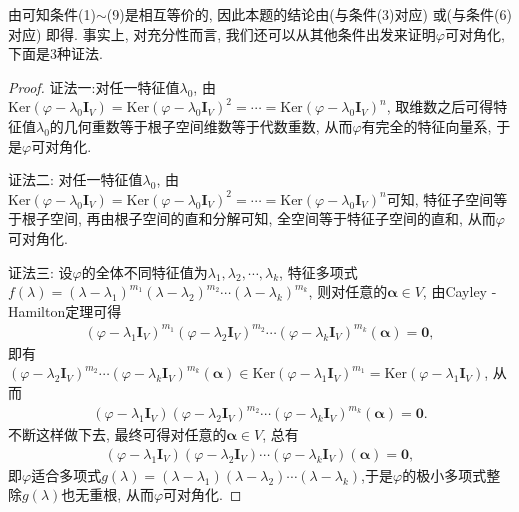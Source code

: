 \documentclass[../../main.tex]{subfiles}%
\begin{document}
\begin{note}
由可知条件(1)$\sim$(9)是相互等价的, 因此本题的结论由(与条件(3)对应) 或(与条件(6)对应) 即得. 事实上, 对充分性而言, 我们还可以从其他条件出发来证明\(\varphi\)可对角化, 下面是\(3\)种证法.
\end{note}
\begin{proof}

{\color{blue}证法一:}对任一特征值\(\lambda_{0}\), 由\(\mathrm{Ker}(\varphi-\lambda_{0}\boldsymbol{I}_{V})=\mathrm{Ker}(\varphi-\lambda_{0}\boldsymbol{I}_{V})^{2}=\cdots=\mathrm{Ker}(\varphi-\lambda_{0}\boldsymbol{I}_{V})^{n}\), 取维数之后可得特征值\(\lambda_{0}\)的几何重数等于根子空间维数等于代数重数, 从而\(\varphi\)有完全的特征向量系, 于是\(\varphi\)可对角化.
    
{\color{blue}证法二:} 对任一特征值\(\lambda_{0}\), 由\(\mathrm{Ker}(\varphi-\lambda_{0}\boldsymbol{I}_{V})=\mathrm{Ker}(\varphi-\lambda_{0}\boldsymbol{I}_{V})^{2}=\cdots=\mathrm{Ker}(\varphi-\lambda_{0}\boldsymbol{I}_{V})^{n}\)可知, 特征子空间等于根子空间, 再由根子空间的直和分解可知, 全空间等于特征子空间的直和, 从而\(\varphi\)可对角化.

{\color{blue}证法三:} 设\(\varphi\)的全体不同特征值为\(\lambda_{1},\lambda_{2},\cdots,\lambda_{k}\), 特征多项式\(f(\lambda)=(\lambda-\lambda_{1})^{m_{1}}(\lambda-\lambda_{2})^{m_{2}}\cdots(\lambda-\lambda_{k})^{m_{k}}\), 则对任意的\(\boldsymbol{\alpha}\in V\), 由Cayley - Hamilton定理可得
\begin{align*}
(\varphi-\lambda_{1}\boldsymbol{I}_{V})^{m_{1}}(\varphi-\lambda_{2}\boldsymbol{I}_{V})^{m_{2}}\cdots(\varphi-\lambda_{k}\boldsymbol{I}_{V})^{m_{k}}(\boldsymbol{\alpha}) = \boldsymbol{0},
\end{align*}
即有\((\varphi-\lambda_{2}\boldsymbol{I}_{V})^{m_{2}}\cdots(\varphi-\lambda_{k}\boldsymbol{I}_{V})^{m_{k}}(\boldsymbol{\alpha})\in\mathrm{Ker}(\varphi-\lambda_{1}\boldsymbol{I}_{V})^{m_{1}}=\mathrm{Ker}(\varphi-\lambda_{1}\boldsymbol{I}_{V})\), 从而
\begin{align*}
(\varphi-\lambda_{1}\boldsymbol{I}_{V})(\varphi-\lambda_{2}\boldsymbol{I}_{V})^{m_{2}}\cdots(\varphi-\lambda_{k}\boldsymbol{I}_{V})^{m_{k}}(\boldsymbol{\alpha}) = \boldsymbol{0}.
\end{align*}
不断这样做下去, 最终可得对任意的\(\boldsymbol{\alpha}\in V\), 总有
\begin{align*}
(\varphi-\lambda_{1}\boldsymbol{I}_{V})(\varphi-\lambda_{2}\boldsymbol{I}_{V})\cdots(\varphi-\lambda_{k}\boldsymbol{I}_{V})(\boldsymbol{\alpha}) = \boldsymbol{0},
\end{align*}
即\(\varphi\)适合多项式\(g(\lambda)=(\lambda-\lambda_{1})(\lambda-\lambda_{2})\cdots(\lambda-\lambda_{k})\),于是$\varphi$的极小多项式整除$g(\lambda)$也无重根, 从而\(\varphi\)可对角化. 
\end{proof}
\end{document}
